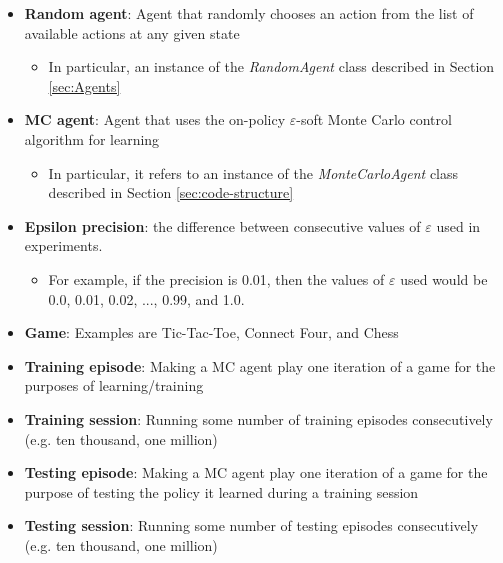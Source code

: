 \documentclass[11pt,a4paper]{report}
\begin{document}
\begin{itemize}

	\item \textbf{Random agent}: Agent that randomly chooses an action from the list of available actions at any given state
		\begin{itemize}
			\item In particular, an instance of the \emph{RandomAgent} class described in Section \ref{sec:Agents}
		\end{itemize}

	\item \textbf{MC agent}: Agent that uses the on-policy $\varepsilon$-soft Monte Carlo control algorithm for learning
		\begin{itemize}
			\item In particular, it refers to an instance of the \emph{MonteCarloAgent} class described in Section \ref{sec:code-structure}
		\end{itemize}

	\item \textbf{Epsilon precision}: the difference between consecutive values of $\varepsilon$ used in experiments.
		\begin{itemize}
			\item For example, if the precision is 0.01, then the values of $\varepsilon$ used would be 0.0, 0.01, 0.02, ..., 0.99, and 1.0.
		\end{itemize}

	\item \textbf{Game}: Examples are Tic-Tac-Toe, Connect Four, and Chess

	\item \textbf{Training episode}: Making a MC agent play one iteration of a game for the purposes of learning/training

	\item \textbf{Training session}: Running some number of training episodes consecutively (e.g. ten thousand, one million)

	\item \textbf{Testing episode}: Making a MC agent play one iteration of a game for the purpose of testing the policy it learned during a training session

	\item \textbf{Testing session}: Running some number of testing episodes consecutively (e.g. ten thousand, one million)

\end{itemize}
\end{document}
